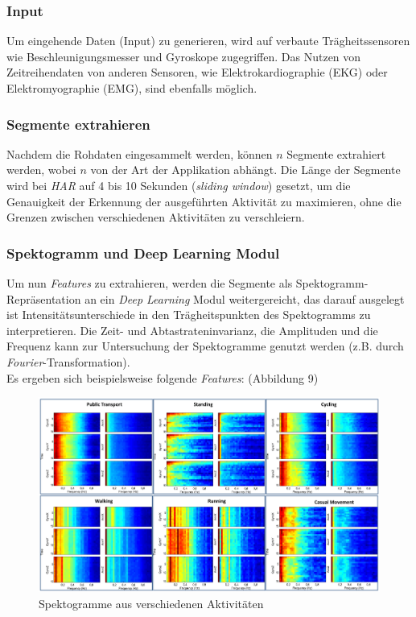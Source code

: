 \documentclass[11pt]{article}
\begin{document}
    \subsubsection{Input}
    Um eingehende Daten (Input) zu generieren, wird auf verbaute Trägheitssensoren wie
    Beschleunigungsmesser und Gyroskope zugegriffen. Das Nutzen von Zeitreihendaten von anderen
    Sensoren, wie Elektrokardiographie (EKG) oder Elektromyographie (EMG), sind
    ebenfalls möglich.

    \subsubsection{Segmente extrahieren}
    Nachdem die Rohdaten eingesammelt werden, können $n$ Segmente extrahiert werden, wobei $n$
    von der Art der Applikation abhängt. Die Länge der Segmente wird bei \textit{HAR} auf
    4 bis 10 Sekunden (\textit{sliding window}) gesetzt, um die Genauigkeit der Erkennung der
    ausgeführten Aktivität zu maximieren, ohne die Grenzen zwischen verschiedenen Aktivitäten
    zu verschleiern.

    \subsubsection{Spektogramm und Deep Learning Modul}
    Um nun \textit{Features} zu extrahieren, werden die Segmente als Spektogramm-Repräsentation
    an ein \textit{Deep Learning} Modul weitergereicht, das darauf ausgelegt ist
    Intensitätsunterschiede in den Trägheitspunkten des Spektogramms zu interpretieren. Die Zeit-
    und Abtastrateninvarianz, die Amplituden und die Frequenz kann zur Untersuchung der Spektogramme
    genutzt werden (z.B. durch \textit{Fourier}-Transformation).\\
    Es ergeben sich beispielsweise folgende \textit{Features}: (Abbildung 9)

    \begin{figure}[ht!]
        \centerings
        \includegraphics[width=11.8cm]{../../resources/features.png}
        \caption{Spektogramme aus verschiedenen Aktivitäten}
    \end{figure}
\end{document}

